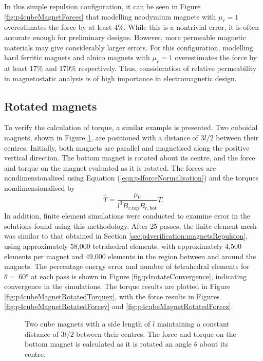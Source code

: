 In this simple repulsion configuration, it can be seen in Figure \ref{fig:p4cubeMagnetForces} that modelling neodymium magnets with \(\mu_r = 1\) overestimates the force by at least 4\%. While this is a nontrivial error, it is often accurate enough for preliminary designs. However, more permeable magnetic materials may give considerably larger errors. For this configuration, modelling hard ferritic magnets and alnico magnets with \(\mu_r = 1\) overestimates the force by at least 17\% and 170\% respectively. Thus, consideration of relative permeability in magnetostatic analysis is of high importance in electromagnetic design.

\subsection{Rotated magnets}
To verify the calculation of torque, a similar example is presented. Two cuboidal magnets, shown in Figure \ref{fig:p4cubeMagnetsRotated}, are positioned with a distance of \(3l/2\) between their centres. Initially, both magnets are parallel and magnetised along the positive vertical direction. The bottom magnet is rotated about its centre, and the force and torque on the magnet evaluated as it is rotated. The forces are nondimensionalised using Equation (\ref{eqn:p4forceNormalisation}) and the torques nondimensionalised by
\begin{equation}
	\hat{T} = \frac{\mu_0}{l^3 B_{r\text{,top}} B_{r,\text{bot}}} T \text{.}
\end{equation}
In addition, finite element simulations were conducted to examine error in the solutions found using this methodology. After 25 passes, the finite element mesh was similar to that obtained in Section \ref{sec:p4verification:magnetsRepulsion}, using approximately 58,000 tetrahedral elements, with approximately 4,500 elements per magnet and 49,000 elements in the region between and around the magnets. The percentage energy error and number of tetrahedral elements for \(\theta =\ \)\ang{60} at each pass is shown in Figure \ref{fig:p4rotateConvergence}, indicating convergence in the simulations. The torque results are plotted in Figure \ref{fig:p4cubeMagnetRotatedTorquex}, with the force results in Figures \ref{fig:p4cubeMagnetRotatedForcey} and \ref{fig:p4cubeMagnetRotatedForcez}.
\begin{figure}
	\centering
	
	\caption{Two cube magnets with a side length of \(l\) maintaining a constant distance of \(3l/2\) between their centres. The force and torque on the bottom magnet is calculated as it is rotated an angle \(\theta\) about its centre.}
	\label{fig:p4cubeMagnetsRotated}
\end{figure}
